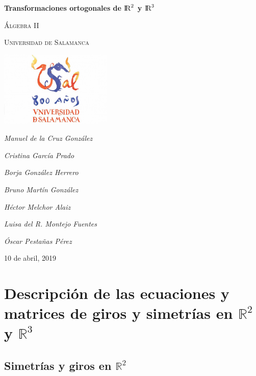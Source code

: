 \documentclass [a4paper,12pt]{article}
\begin{document}
\renewcommand{\thesubsection}{\thesection.\alph{subsection}}
\begin{titlepage}
	\centering
	{\huge\bfseries Transformaciones ortogonales de  ${\rm I\!R}^2$ y ${\rm I\!R}^3$\par}
	\vspace{2cm}
	{\scshape\Large Álgebra II\par}
	\vspace{1cm}
	{\scshape\Large Universidad de Salamanca\par}
	\vspace{1cm}
	\includegraphics[width=0.4\textwidth]
{usal}\par\vspace{1cm}
	\vspace{1.5cm}
	{\Large\itshape Manuel de la Cruz González\par}
	{\Large\itshape Cristina García Prado\par}
	{\Large\itshape Borja González Herrero\par}
	{\Large\itshape Bruno Martín González\par}
	{\Large\itshape Héctor Melchor Alaiz\par}
	{\Large\itshape Luisa del R. Montejo Fuentes\par}
	{\Large\itshape Óscar Pestañas Pérez\par}
	\vfill

	{\large 10 de abril, 2019\par}
\end{titlepage}

\tableofcontents
\newpage
\section{Descripción de las ecuaciones y matrices de giros y simetrías en $\mathbb{R}^2$ y $\mathbb{R}^3$}

\subsection{Simetrías y giros en  $\mathbb{R}^2$}
\end{document}
